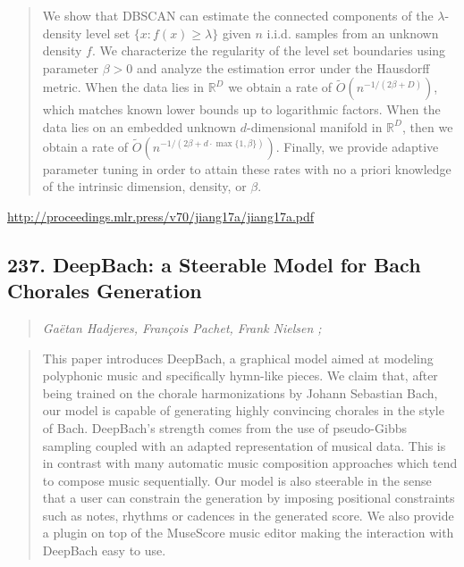 \documentclass{article}
\begin{document}
\begin{quote}
    We show that DBSCAN can estimate the connected components of the $\lambda$-density level set $\{ x : f(x) \ge \lambda\}$ given $n$ i.i.d. samples from an unknown density $f$. We characterize the regularity of the level set boundaries using parameter $\beta > 0$ and analyze the estimation error under the Hausdorff metric. When the data lies in $\mathbb{R}^D$ we obtain a rate of $\widetilde{O}(n^{-1/(2\beta + D)})$, which matches known lower bounds up to logarithmic factors. When the data lies on an embedded unknown $d$-dimensional manifold in $\mathbb{R}^D$, then we obtain a rate of $\widetilde{O}(n^{-1/(2\beta + d\cdot \max\{1, \beta \})})$. Finally, we provide adaptive parameter tuning in order to attain these rates with no a priori knowledge of the intrinsic dimension, density, or $\beta$.  
\end{quote}

\href{http://proceedings.mlr.press/v70/jiang17a/jiang17a.pdf}{http://proceedings.mlr.press/v70/jiang17a/jiang17a.pdf}

\subsection{237. DeepBach: a Steerable Model for Bach Chorales Generation}

\begin{quote}
\footnotesize{\textit{Gaëtan Hadjeres, François Pachet, Frank Nielsen ;}}

\end{quote}

\begin{quote}
    This paper introduces DeepBach, a graphical model aimed at modeling polyphonic music and specifically hymn-like pieces. We claim that, after being trained on the chorale harmonizations by Johann Sebastian Bach, our model is capable of generating highly convincing chorales in the style of Bach. DeepBach’s strength comes from the use of pseudo-Gibbs sampling coupled with an adapted representation of musical data. This is in contrast with many automatic music composition approaches which tend to compose music sequentially. Our model is also steerable in the sense that a user can constrain the generation by imposing positional constraints such as notes, rhythms or cadences in the generated score. We also provide a plugin on top of the MuseScore music editor making the interaction with DeepBach easy to use.  
\end{quote}
\end{document}

